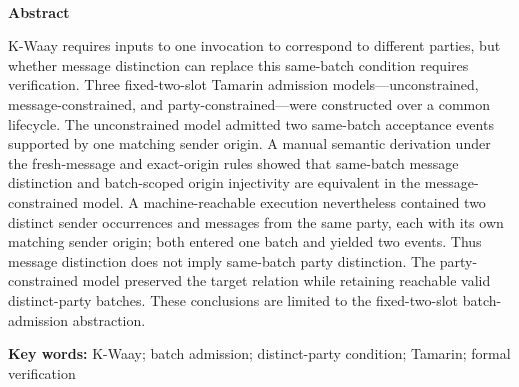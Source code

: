 \begin{abstract}
K-Waay的\batchreceive 要求同次调用对应不同参与方，但消息限制能否替代该条件需验证。基于共同生命周期构造无互异、消息互异和参与方互异三种固定两槽Tamarin准入模型。无互异模型允许一个匹配发送来源对应同批两个接受；人工语义推导表明，新鲜消息和精确来源匹配使消息互异性与批内来源单射性等价。机器可达见证显示，同一参与方的不同发送实例与消息各有匹配发送来源，可同批接受，故消息约束不能推出参与方互异性。参与方模型保持目标关系，有效批次可达。结论限于固定两槽准入抽象。

\noindent\textbf{关键词：}K-Waay；批次准入；批内参与方互异条件；Tamarin；形式化验证
\end{abstract}

\begin{center}
  \large\bfseries \englishtitle\\[0.5em]
  \normalsize Abstract
\end{center}
\noindent
K-Waay requires inputs to one \batchreceive invocation to correspond to
different parties, but whether message distinction can replace this same-batch
condition requires verification.  Three fixed-two-slot Tamarin admission
models---unconstrained, message-constrained, and party-constrained---were
constructed over a common lifecycle.  The unconstrained model admitted two
same-batch acceptance events supported by one matching sender origin.  A
manual semantic derivation under the fresh-message and exact-origin rules
showed that same-batch message distinction and batch-scoped origin injectivity
are equivalent in the message-constrained model.  A machine-reachable
execution nevertheless contained two distinct sender occurrences and messages
from the same party, each with its own matching sender origin; both entered one
batch and yielded two \receiveraccept events.  Thus message distinction does
not imply same-batch party distinction.  The party-constrained model preserved
the target relation while retaining reachable valid distinct-party batches.
These conclusions are limited to the fixed-two-slot batch-admission abstraction.

\noindent\textbf{Key words:} K-Waay; batch admission; distinct-party
condition; Tamarin; formal verification

